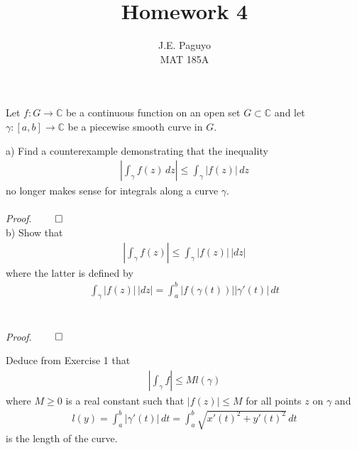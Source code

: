 \documentclass[12pt]{article}
\newcommand{\C}{\mathbb{C}}
\newenvironment{exercise}[2][Exercise]{\begin{trivlist}
\item[\hskip \labelsep {\bfseries #1}\hskip \labelsep {\bfseries #2.}]}{\end{trivlist}}
\begin{document}
 
\title{Homework 4} 
\author{J.E. Paguyo \\ MAT 185A} 
\maketitle
 
\begin{exercise}{1} Let $f: G \to \C$ be a continuous function on an open set $G \subset \C$ and let $\gamma : [a,b] \to \C$ be a piecewise smooth curve in $G$. 
\end{exercise}
 
\noindent a) Find a counterexample demonstrating that the inequality 
\begin{align*}
\left| \int_{\gamma} f(z) \, dz \right| \leq \int_{\gamma} |f(z)| \, dz
\end{align*}
no longer makes sense for integrals along a curve $\gamma$. \\ \\
{\em Proof}. 
$\hfill \qed$ \\

\noindent b) Show that 
\begin{align*}
\left| \int_{\gamma} f(z) \right| \leq \int_{\gamma} |f(z)| \, |dz|
\end{align*}
where the latter is defined by 
\begin{align*}
\int_{\gamma} |f(z)| \, |dz| = \int_a^b |f(\gamma (t))||\gamma'(t)| \, dt 
\end{align*} \\ \\ 
{\em Proof}.
$\hfill \qed$ \\

\begin{exercise}{2} Deduce from Exercise 1 that 
\begin{align*}
\left| \int_{\gamma} f \right| \leq Ml(\gamma)
\end{align*}
where $M \geq 0$ is a real constant such that $|f(z)| \leq M$ for all points $z$ on $\gamma$ and 
\begin{align*}
l(y) = \int_a^b |\gamma'(t)| \, dt = \int_a^b \sqrt{x'(t)^2 + y'(t)^2} \, dt
\end{align*}
is the length of the curve. 



\end{exercise}
 
\end{document}
